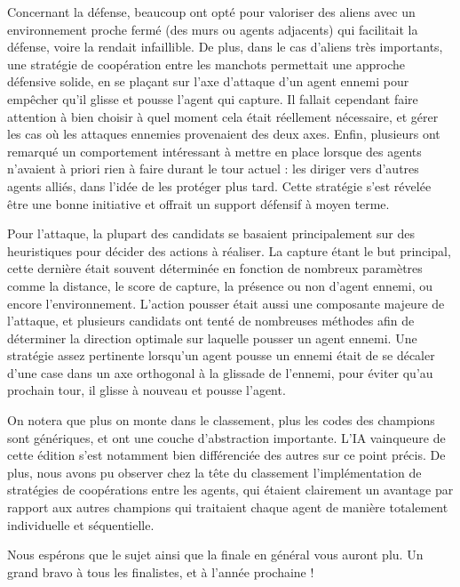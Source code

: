 \documentclass[a4paper,12pt,notitle,noheader,nofooter]{prologin}
\begin{document}
\bigbreak

Concernant la défense, beaucoup ont opté pour valoriser des aliens avec un
environnement proche fermé (des murs ou agents adjacents) qui facilitait la
défense, voire la rendait infaillible. De plus, dans le cas d'aliens très
importants, une stratégie de coopération entre les manchots permettait une
approche défensive solide, en se plaçant sur l'axe d'attaque d'un agent ennemi
pour empêcher qu'il glisse et pousse l'agent qui capture. Il fallait cependant
faire attention à bien choisir à quel moment cela était réellement nécessaire,
et gérer les cas où les attaques ennemies provenaient des deux axes. Enfin,
plusieurs ont remarqué un comportement intéressant à mettre en place lorsque des
agents n'avaient à priori rien à faire durant le tour actuel : les diriger vers
d'autres agents alliés, dans l'idée de les protéger plus tard. Cette stratégie
s'est révelée être une bonne initiative et offrait un support défensif à moyen
terme.

\bigbreak

Pour l'attaque, la plupart des candidats se basaient principalement sur des
heuristiques pour décider des actions à réaliser. La capture étant le but
principal, cette dernière était souvent déterminée en fonction de nombreux
paramètres comme la distance, le score de capture, la présence ou non d'agent
ennemi, ou encore l'environnement. L'action pousser était aussi une composante
majeure de l'attaque, et plusieurs candidats ont tenté de nombreuses méthodes 
afin de déterminer la direction optimale sur laquelle pousser un agent ennemi.
Une stratégie assez pertinente lorsqu'un agent pousse un ennemi était de se
décaler d'une case dans un axe orthogonal à la glissade de l'ennemi, pour éviter
qu'au prochain tour, il glisse à nouveau et pousse l'agent.

\newpage

On notera que plus on monte dans le classement, plus les codes des champions
sont génériques, et ont une couche d'abstraction importante. L'IA vainqueure de
cette édition s'est notamment bien différenciée des autres sur ce point précis.
De plus, nous avons pu observer chez la tête du classement l'implémentation de
stratégies de coopérations entre les agents, qui étaient clairement un avantage
par rapport aux autres champions qui traitaient chaque agent de manière
totalement individuelle et séquentielle.

\bigbreak

Nous espérons que le sujet ainsi que la finale en général vous auront plu. Un
grand bravo à tous les finalistes, et à l'année prochaine !
\end{document}
